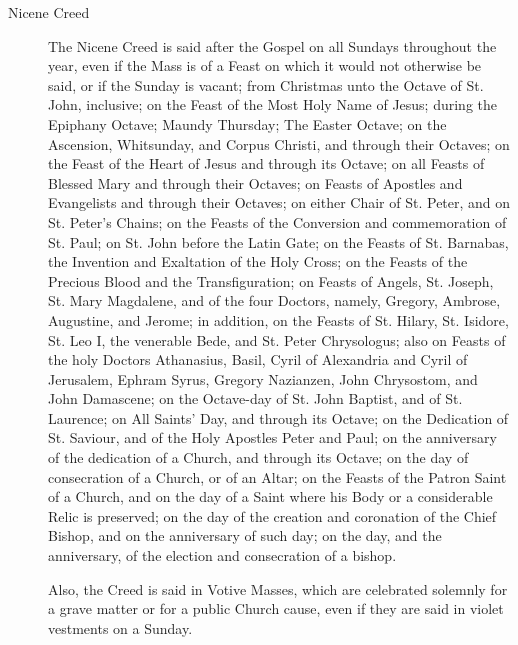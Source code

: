 \begin{description}
    \item[Nicene Creed] The Nicene Creed is said after the Gospel on all Sundays throughout the year, even if the Mass is of a Feast on which it would not otherwise be said, or if the Sunday is vacant; from Christmas unto the Octave of St. John, inclusive; on the Feast of the Most Holy Name of Jesus; during the Epiphany Octave; Maundy Thursday; The Easter Octave; on the Ascension, Whitsunday, and Corpus Christi, and through their Octaves; on the Feast of the Heart of Jesus and through its Octave; on all Feasts of Blessed Mary and through their Octaves; on Feasts of Apostles and Evangelists and through their Octaves; on either Chair of St. Peter, and on St. Peter's Chains; on the Feasts of the Conversion and commemoration of St. Paul; on St. John before the Latin Gate; on the Feasts of St. Barnabas, the Invention and Exaltation of the Holy Cross; on the Feasts of the Precious Blood and the Transfiguration; on Feasts of Angels, St. Joseph, St. Mary Magdalene, and of the four Doctors, namely, Gregory, Ambrose, Augustine, and Jerome; in addition, on the Feasts of St. Hilary, St. Isidore, St. Leo I, the venerable Bede, and St. Peter Chrysologus; also on Feasts of the holy Doctors Athanasius, Basil, Cyril of Alexandria and Cyril of Jerusalem, Ephram Syrus, Gregory Nazianzen, John Chrysostom, and John Damascene; on the Octave-day of St. John Baptist, and of St. Laurence; on All Saints' Day, and through its Octave; on the Dedication of St. Saviour, and of the Holy Apostles Peter and Paul; on the anniversary of the dedication of a Church, and through its Octave; on the day of consecration of a Church, or of an Altar; on the Feasts of the Patron Saint of a Church, and on the day of a Saint where his Body or a considerable Relic is preserved; on the day of the creation and coronation of the Chief Bishop, and on the anniversary of such day; on the day, and the anniversary, of the election and consecration of a bishop.\par
    \par
    Also, the Creed is said in Votive Masses, which are celebrated solemnly for a grave matter or for a public Church cause, even if they are said in violet vestments on a Sunday.

\end{description}
